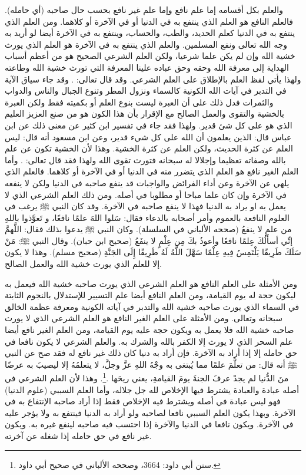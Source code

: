 والعلم بكل أقسامه إما علم نافع وإما علم غير نافع بحسب حال صاحبه (أي حامله). فالعلم النافع هو العلم الذي ينتفع به في الدنيا أو في الآخرة أو كلاهما. ومن العلم الذي ينتفع به في الدنيا كعلم الحديد، والطب، والحساب، وينتفع به في الآخرة أيضا لو أريد به وجه الله تعالى ونفع المسلمين. والعلم الذي ينتفع به في الآخرة هو العلم الذي يورث خشية الله وإن لم يكن علما شرعيا، ولكن العلم الشرعي الصحيح هو من أعظم أسباب الهداية إلى معرفة الله وحقه وحق عباده علينا المعرفة التي تورث خشية الله وطاعته ولهذا يأتي لفظ العلم بالإطلاق على العلم الشرعي. وقد قال تعالى: \quranayah*[35][28][8]{\footnotesize \surahname*[35]}. وقد جاء سياق الآية في التدبر في آيات الله الكونية كالسماء ونزول المطر وتنوع الجبال والناس والدواب والثمرات فدل ذلك على أن العبرة ليست بنوع العلم أو بكميته فقط ولكن العبرة بالخشية والتقوى والعمل الصالح مع الإقرار بأن هذا الكون هو من صنع العزيز العليم الذي هو على كل شئ قدير. ولهذا فقد جاء في تفسير ابن كثير عن معنى ذلك عن ابن عباس قال: الذين يعلمون أن الله على كل شيء قدير، وعن ابن مسعود أنه قال: ليس العلم عن كثرة الحديث، ولكن العلم عن كثرة الخشية. وهذا لأن الخشية تكون عن علم بالله وصفاته تعظيما وإجلالا له سبحانه فتورث تقوى الله ولهذا فقد قال تعالى: \quranayah*[24][52]{\footnotesize \surahname*[24]}. وأما العلم الغير نافع هو العلم الذي يتضرر منه في الدنيا أو في الآخرة أو كلاهما. فالعلم الذي يلهي عن الآخرة وعن أداء الفرائض والواجبات قد ينفع صاحبه في الدنيا ولكن لا ينفعه في الآخرة وإن كان علما مباحا أو مطلوبا في أصله. ومن ذلك العلم الشرعي الذي لا يعمل به او يراد به الدنيا فهذا لا ينفع صاحبه في الآخرة. وقد كان النبي ﷺ يرغب في العلوم النافعة بالعموم وأمر أصحابه بالدعاء فقال: سَلوا اللهَ علمًا نافعًا، و تَعوَّذوا باللهِ من علمٍ لا ينفعُ {\footnotesize (صححه الألباني في السلسلة)}. وكان النبي ﷺ يدعوا بذلك فقال: اللَّهمَّ إنِّي أسأَلُكَ عِلمًا نافعًا وأعوذُ بكَ مِن عِلْمٍ لا ينفَعُ {\footnotesize (صحيح ابن حبان)}. وقال النبي ﷺ: مَنْ سَلَكَ طَرِيقًا يَلْتَمِسُ فِيهِ عِلْمًا سَهَّلَ اللَّهُ لَهُ طَرِيقًا إِلَى الجَنَّةِ {\footnotesize (صحيح مسلم)}. وهذا لا يكون إلا للعلم الذي يورث خشية الله والعمل الصالح.

ومن الأمثلة على العلم النافع هو العلم الشرعي الذي يورث صاحبه خشية الله فيعمل به ليكون حجة له يوم القيامة، ومن العلم النافع أيضا علم التسيير للإستدلال بالنجوم الثابتة في السماء الذي يورث صاحبه خشية الله والتدبر في آياته الكونية ومعرفة عظمة الخالق سبحانه وتعالى. ومن الأمثلة على العلم الغير النافع هو العلم الشرعي الذي لا يورث صاحبه خشية الله فلا يعمل به ويكون حجة عليه يوم القيامة، ومن العلم الغير نافع أيضا علم السحر الذي لا يورث إلا الكفر بالله والشرك به. والعلم الشرعي لا يكون نافعا في حق حامله إلا إذا أراد به الآخرة. فإن أراد به دنيا كان ذلك غير نافع له فقد صح عن النبي ﷺ أنه قال: 
من تعلَّمَ علمًا مما يُبتغى به وجْهُ اللهِ عزَّ وجلَّ، لا يتعلمُهُ إلا ليصيبَ به عرضًا منَ الدُّنيا لم يجدْ عرفَ الجنةَ يومَ القيامةِ، يعني ريحَها \href{https://shamela.ws/book/117359/3086#p1}{\faExternalLink} \cite{SunanAbiDawood}.\footnote{سنن أبي داود: 3664، وصححه الألباني في صحيح أبي داود.}. وهذا لأن العلم الشرعي في أصله عبادة والعبادة يشترط فيها الإخلاص لله جل جلاله، وأما العلم السببي (علوم الدنيا)  فهو ليس عبادة في أصله ويشترط فيه الإخلاص فقط إذا أراد صاحبه الإنتفاع به في الآخرة. وبهذا يكون العلم السببي نافعا لصاحبه ولو أراد به الدنيا فينتفع به ولا يؤجر عليه في الآخرة. ويكون نافعا في الدنيا والآخرة إذا احتسب فيه صاحبه لينفع غيره به. ويكون غير نافع في حق حامله إذا شغله عن آخرته.


